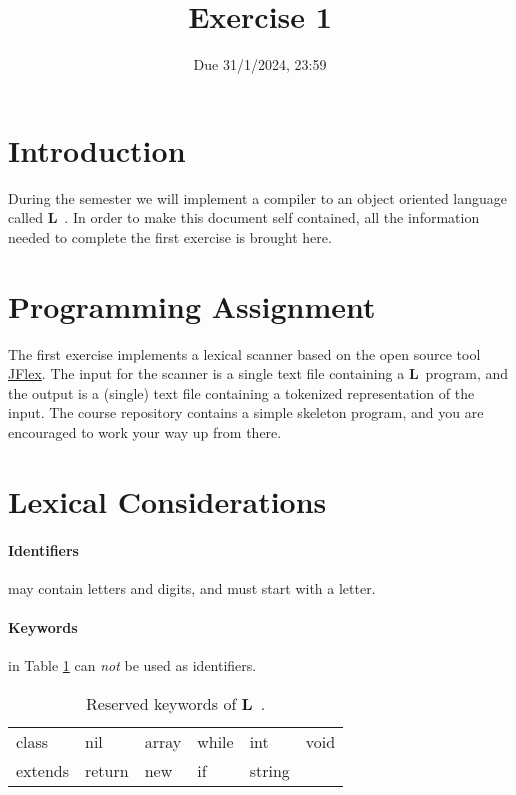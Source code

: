 \documentclass{article}
\begin{document}
\title{Exercise 1}


\date{Due 31/1/2024, 23:59}

\maketitle

\newcommand{\plname}{\textbf{L}\ }

\section{Introduction}
During the semester we will implement a compiler to an object oriented language called \plname.
In order to make this document self contained,
all the information needed to complete the first exercise is brought here.

\section{Programming Assignment}
The first exercise implements a lexical scanner based on the
open source tool \href{http://jflex.de/}{JFlex}.
The input for the scanner is a single text file containing a \plname program,
and the output is a (single) text file containing a tokenized representation of the input.
The course repository contains a simple skeleton program,
and you are encouraged to work your way up from there.

\section{Lexical Considerations}
\paragraph{Identifiers} may contain letters and digits, and must start with a letter.
\paragraph{Keywords} in Table \ref{Table_Reserved_Keywords} can \textit{not}
be used as identifiers.
\begin{table}[h]
\centering
\begin{tabular}{l l l l l l}
class & nil & array & while & int & void \\
extends & return & new & if & string & \\
\end{tabular}
\caption{
Reserved keywords of \plname.
\label{Table_Reserved_Keywords}}
\end{table}
\end{document}
